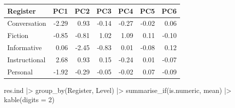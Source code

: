 \documentclass[
  letterpaper,
  DIV=11,
  numbers=noendperiod]{scrreprt}
\newenvironment{Shaded}{\begin{snugshade}}{\end{snugshade}}
\newcommand{\AttributeTok}[1]{\textcolor[rgb]{0.40,0.45,0.13}{#1}}
\newcommand{\DecValTok}[1]{\textcolor[rgb]{0.68,0.00,0.00}{#1}}
\newcommand{\FunctionTok}[1]{\textcolor[rgb]{0.28,0.35,0.67}{#1}}
\newcommand{\NormalTok}[1]{\textcolor[rgb]{0.00,0.23,0.31}{#1}}
\newcommand{\SpecialCharTok}[1]{\textcolor[rgb]{0.37,0.37,0.37}{#1}}
\begin{document}
\begin{longtable}[]{@{}lrrrrrr@{}}
\toprule\noalign{}
Register & PC1 & PC2 & PC3 & PC4 & PC5 & PC6 \\
\midrule\noalign{}
\endhead
\bottomrule\noalign{}
\endlastfoot
Conversation & -2.29 & 0.93 & -0.14 & -0.27 & -0.02 & 0.06 \\
Fiction & -0.85 & -0.81 & 1.02 & 1.09 & 0.11 & -0.10 \\
Informative & 0.06 & -2.45 & -0.83 & 0.01 & -0.08 & 0.12 \\
Instructional & 2.68 & 0.93 & 0.15 & -0.24 & 0.01 & -0.07 \\
Personal & -1.92 & -0.29 & -0.05 & -0.02 & 0.07 & -0.09 \\
\end{longtable}

\begin{Shaded}
\begin{Highlighting}[]
\NormalTok{res.ind }\SpecialCharTok{|\textgreater{}} 
  \FunctionTok{group\_by}\NormalTok{(Register, Level) }\SpecialCharTok{|\textgreater{}} 
  \FunctionTok{summarise\_if}\NormalTok{(is.numeric, mean) }\SpecialCharTok{|\textgreater{}} 
  \FunctionTok{kable}\NormalTok{(}\AttributeTok{digits =} \DecValTok{2}\NormalTok{)}
\end{Highlighting}
\end{Shaded}
\end{document}
